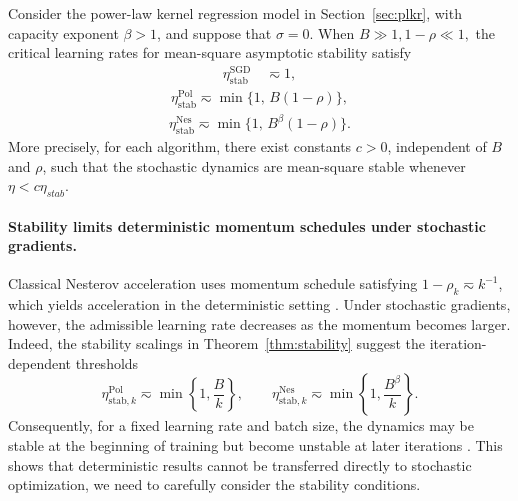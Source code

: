\documentclass[11pt]{article}
\begin{document}
\begin{theorem}
\label{thm:stability}
Consider the power-law kernel regression model in
Section~\ref{sec:plkr}, with capacity exponent $\beta>1$, and suppose that $\sigma=0$. When \( B\gg 1, 1-\rho\ll 1, \) the critical learning rates for mean-square asymptotic stability satisfy 
\begin{align} 
\eta_{\mathrm{stab}}^{\mathrm{SGD}} \quad \eqsim 1,  
\end{align}
\vspace{-2.5em}
\begin{align} 
\eta_{\mathrm{stab}}^{\mathrm{Pol}} \eqsim \min\{1,\,B(1-\rho)\}, 
\end{align}
\vspace{-2.5em}
\begin{align} 
\eta_{\mathrm{stab}}^{\mathrm{Nes}} \eqsim \min\{1,\,B^\beta(1-\rho)\}. 
\end{align}
More precisely, for each algorithm, there exist constants \(c>0\), independent of $B$ and $\rho$, such that the stochastic dynamics are mean-square stable whenever \(\eta<c\eta_{stab}\).
\end{theorem}

\paragraph{Stability limits deterministic momentum schedules under stochastic gradients.}
Classical Nesterov acceleration uses momentum schedule satisfying \(1-\rho_k\eqsim k^{-1}\), which yields acceleration in the deterministic setting \citep{nesterov1983method}. Under stochastic gradients, however, the admissible learning rate decreases as the momentum becomes larger. Indeed, the stability scalings in Theorem~\ref{thm:stability} suggest the iteration-dependent thresholds
\[
\eta_{\mathrm{stab},k}^{\mathrm{Pol}}
\eqsim
\min\left\{1,\frac{B}{k}\right\},
\qquad
\eta_{\mathrm{stab},k}^{\mathrm{Nes}}
\eqsim
\min\left\{1,\frac{B^\beta}{k}\right\}.
\]
Consequently, for a fixed learning rate and batch size, the dynamics may be stable at the beginning of training but become unstable at later iterations \citep{yarotsky2025corner}. This shows that deterministic results cannot be transferred directly to stochastic optimization, we need to carefully consider the stability conditions.
\end{document}
